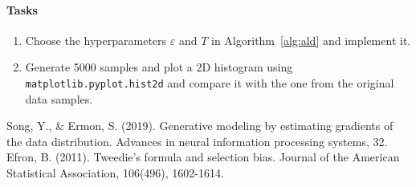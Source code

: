\documentclass{article}
\begin{document}
\paragraph{Tasks}
\begin{enumerate}
\item Choose the hyperparameters $\varepsilon$ and $T$ in Algorithm~\ref{alg:ald} and implement it. 
\item Generate 5000 samples and plot a 2D histogram using \texttt{matplotlib.pyplot.hist2d} and compare it with the one from the original data samples. 
\end{enumerate}

\begin{thebibliography}{99}
Song, Y., \& Ermon, S. (2019). Generative modeling by estimating gradients of the data distribution. Advances in neural information processing systems, 32.
Efron, B. (2011). Tweedie’s formula and selection bias. Journal of the American Statistical Association, 106(496), 1602-1614.
\end{thebibliography}
\end{document}
